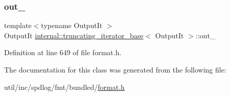 \mbox{\label{classinternal_1_1truncating__iterator__base_ad71c2995e490bc04f31c7981a1b84e42}} 
\subsubsection{\texorpdfstring{out\+\_\+}{out\_}}
{\footnotesize\ttfamily template$<$typename Output\+It $>$ \\
Output\+It \hyperlink{classinternal_1_1truncating__iterator__base}{internal\+::truncating\+\_\+iterator\+\_\+base}$<$ Output\+It $>$\+::out\+\_\+\hspace{0.3cm}{\ttfamily [protected]}}



Definition at line 649 of file format.\+h.



The documentation for this class was generated from the following file\+:\begin{DoxyCompactItemize}
\item 
util/inc/spdlog/fmt/bundled/\hyperlink{format_8h}{format.\+h}\end{DoxyCompactItemize}
